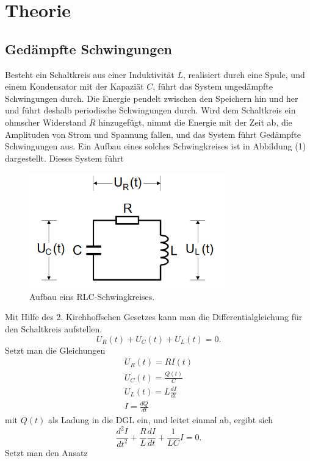 \section{Theorie}
\label{sec:Theorie}

\subsection {Gedämpfte Schwingungen}
Besteht ein Schaltkreis aus einer Induktivität $L$, realisiert durch eine Spule, und einem Kondensator mit der Kapaziät $C$, führt das System
ungedämpfte Schwingungen durch. Die Energie pendelt zwischen den Speichern hin und her und führt deshalb periodische Schwingungen durch.
Wird dem Schaltkreis ein ohmscher Widerstand $R$ hinzugefügt, nimmt die Energie mit der Zeit ab, die Amplituden von Strom und Spannung fallen,
und das System führt Gedämpfte Schwingungen aus. Ein Aufbau eines solches Schwingkreises ist in Abbildung (1) dargestellt. Dieses System führt
\begin{figure}[H]
  \centering
  \includegraphics[height=5cm]{RLC.png}
  \caption{Aufbau eins RLC-Schwingkreises. \cite[S.1]{kent}}
\end{figure}
\noindent Mit Hilfe des 2. Kirchhoffschen Gesetzes kann man die Differentialgleichung für den Schaltkreis aufstellen.
\begin{equation}
U_R (t) + U_C (t) + U_L (t) = 0 .
\end{equation}
Setzt man die Gleichungen
\begin{align}
U_R (t) = R I(t)  \\
U_C (t) = \frac{Q(t)}{C}  \\
U_L (t) = L \frac{dI}{dt} \\
I = \frac{dQ}{dt}
\end{align}
mit $Q(t)$ als Ladung in die DGL ein, und leitet einmal ab, ergibt sich 
\begin{equation}
\frac{d^2I}{dt^2} + \frac{R}{L}\frac{dI}{dt} + \frac{1}{LC}I = 0 .
\end{equation}
Setzt man den Ansatz
